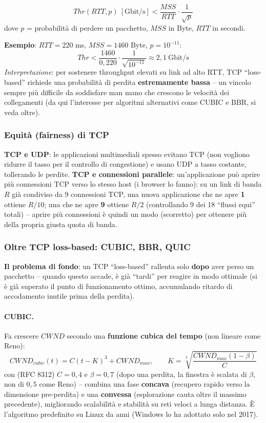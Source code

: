 \documentclass[12pt, a4paper]{article}
\begin{document}
\begin{tcolorbox}[colback=lightergray!10, colframe=tocsec, title=\textbf{Formula di Mathis et al.\ (1997)}]
$$Thr(RTT,p)\ [\text{Gbit/s}] < \frac{MSS}{RTT}\cdot\frac{1}{\sqrt{p}}$$
dove $p$ = probabilità di perdere un pacchetto, $MSS$ in Byte, $RTT$ in secondi.

\textbf{Esempio}: $RTT=220$ ms, $MSS=1460$ Byte, $p=10^{-11}$:
$$Thr < \frac{1460}{0{,}220}\cdot\frac{1}{\sqrt{10^{-11}}} \approx 2{,}1 \ \text{Gbit/s}$$
\textit{Interpretazione}: per sostenere throughput elevati su link ad alto RTT, TCP ``loss-based'' richiede una probabilità di perdita \textbf{estremamente bassa} -- un vincolo sempre più difficile da soddisfare man mano che crescono le velocità dei collegamenti (da qui l'interesse per algoritmi alternativi come CUBIC e BBR, si veda oltre).
\end{tcolorbox}

\subsubsection{Equità (fairness) di TCP}

\textbf{TCP e UDP}: le applicazioni multimediali spesso evitano TCP (non vogliono ridurre il tasso per il controllo di congestione) e usano UDP a tasso costante, tollerando le perdite. \textbf{TCP e connessioni parallele}: un'applicazione può aprire più connessioni TCP verso lo stesso host (i browser lo fanno): su un link di banda $R$ già condiviso da 9 connessioni TCP, una nuova applicazione che ne apre \textbf{1} ottiene $R/10$; una che ne apre \textbf{9} ottiene $R/2$ (controllando 9 dei 18 ``flussi equi'' totali) -- aprire più connessioni è quindi un modo (scorretto) per ottenere più della propria giusta quota di banda.

\subsubsection{Oltre TCP loss-based: CUBIC, BBR, QUIC}

\textbf{Il problema di fondo}: un TCP ``loss-based'' rallenta solo \textbf{dopo} aver perso un pacchetto -- quando questo accade, è già ``tardi'' per reagire in modo ottimale (si è già superato il punto di funzionamento ottimo, accumulando ritardo di accodamento inutile prima della perdita).

\paragraph{CUBIC.} Fa crescere $CWND$ secondo una \textbf{funzione cubica del tempo} (non lineare come Reno):
$$CWND_{cubic}(t) = C(t-K)^3 + CWND_{max}, \qquad K=\sqrt[3]{\frac{CWND_{max}(1-\beta)}{C}}$$
con (RFC 8312) $C=0{,}4$ e $\beta=0{,}7$ (dopo una perdita, la finestra è scalata di $\beta$, non di $0{,}5$ come Reno) -- combina una fase \textbf{concava} (recupero rapido verso la dimensione pre-perdita) e una \textbf{convessa} (esplorazione cauta oltre il massimo precedente), migliorando scalabilità e stabilità su reti veloci a lunga distanza. È l'algoritmo predefinito su Linux da anni (Windows lo ha adottato solo nel 2017).
\end{document}

